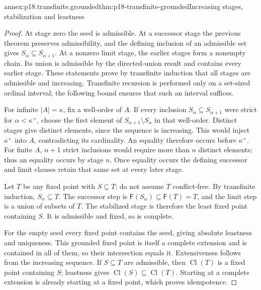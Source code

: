 \begin{annexitem}{annex:p18.transfinite.grounded}{thm:p18-transfinite-grounded}{Increasing stages, stabilization and leastness}
\begin{proof}
At stage zero the seed is admissible.
At a successor stage the previous theorem
preserves admissibility, and the defining
inclusion of an admissible set gives
\(S_\alpha\subseteq S_{\alpha+1}\).
At a nonzero limit stage, the earlier
stages form a nonempty chain. Its
union is admissible by the directed-union
result and contains every earlier
stage. These statements prove by
transfinite induction that all stages
are admissible and increasing.
Transfinite recursion is performed
only on a set-sized ordinal interval;
the following bound ensures that
such an interval suffices.

For infinite \(|A|=\kappa\), fix
a well-order of \(A\). If every
inclusion \(S_\alpha\subseteq S_{\alpha+1}\)
were strict for \(\alpha<\kappa^+\),
choose the first element of
\(S_{\alpha+1}\setminus S_\alpha\)
in that well-order. Distinct stages
give distinct elements, since the
sequence is increasing. This would
inject \(\kappa^+\) into \(A\),
contradicting its cardinality.
An equality therefore occurs
before \(\kappa^+\).
For finite \(A\), \(n+1\)
strict inclusions would require
more than \(n\) distinct elements;
thus an equality occurs by
stage \(n\). Once equality
occurs the defining successor
and limit clauses retain that
same set at every later stage.

Let \(T\) be any fixed point
with \(S\subseteq T\); do not
assume \(T\) conflict-free.
By transfinite induction,
\(S_\alpha\subseteq T\).
The successor step is
\(\mathsf F(S_\alpha)\subseteq
  \mathsf F(T)=T\), and
the limit step is a union
of subsets of \(T\).
The stabilized stage is
therefore the least fixed
point containing \(S\).
It is admissible and fixed,
so is complete.

For the empty seed every
fixed point contains the
seed, giving absolute
leastness and uniqueness.
This grounded fixed point
is itself a complete
extension and is contained
in all of them, so their
intersection equals it.
Extensiveness follows from
the increasing sequence.
If \(S\subseteq T\) are
admissible, then
\(\operatorname{Cl}(T)\)
is a fixed point containing
\(S\); leastness gives
\(\operatorname{Cl}(S)\subseteq
  \operatorname{Cl}(T)\).
Starting at a complete
extension is already
starting at a fixed point,
which proves idempotence.
\end{proof}
\end{annexitem}

